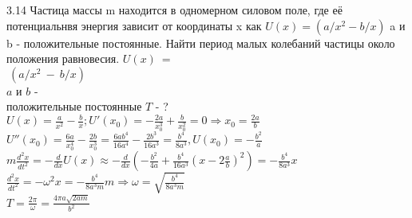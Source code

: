 \testCom
{%
	3.14
}
{%
	Частица массы m находится в одномерном силовом поле, где её потенциальнвя энергия зависит от координаты x как $U(x)=(a/x^2 - b/x)$  a и b - положительные постоянные. Найти период малых колебаний частицы около положения равновесия.
}
{%
	$U(x)~=$\\
	$~(a/x^2~-~b/x)$ \\
	$a$ и $b$ -\\ положительные постоянные
}
{%
	$T$ - ?
}
{%
	$U(x)=\frac{a}{x^2} - \frac{b}{x}; U'({x}_{0}) = - \frac{2a}{{x}_{0}^3} + \frac{b}{{x}_{0}^2}=0 \Rightarrow {x}_{0} = \frac{2a}{b}$\\
	$U''({x}_{0}) = \frac{6a}{{x}_{0}^4} - \frac{2b}{{x}_{0}^3} = \frac{6ab^4}{16a^4} - \frac{2b^3}{16a^3} = \frac{b^4}{8 a^3}, U({x}_{0}) = - \frac{b^2}{a}$\\
	$m \frac{d^2x}{dt^2} = - \frac{d}{dx}U(x) \approx - \frac{d}{dx} \left(-\frac{b^2}{4a} + \frac{b^4}{16a^3}\left(x - 2\frac{a}{b} \right)^2 \right)= - \frac{b^4}{8a^3}x$\\
	$\frac{d^2x}{dt^2} = - \omega^2 x = - \frac{b^4}{8a^3 m}m \Rightarrow \omega = \sqrt{\frac{b^4}{8a^3m}}$\\
	$T = \frac{2\pi}{\omega}=\frac{4\pi a\sqrt{2 a m}}{b^2}$\\
}

